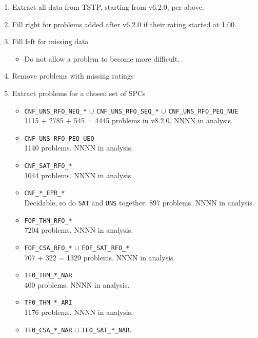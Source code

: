 \documentclass[runningheads]{llncs}
\begin{document}
\begin{enumerate}
\item Extract all data from TSTP, starting from v6.2.0, per above.
\item Fill right for problems added after v6.2.0 if their rating started at 1.00. 
\item Fill left for missing data
      \begin{itemize}
      \item Do not allow a problem to become more difficult.
      \end{itemize}
\item Remove problems with missing ratings
\item Extract problems for a chosen set of SPCs 
      \begin{itemize}
      \item {\tt CNF\_UNS\_RFO\_NEQ\_*} $\cup$ {\tt CNF\_UNS\_RFO\_SEQ\_*} $\cup$ 
            {\tt CNF\_UNS\_RFO\_PEQ\_NUE} \\
            1115 + 2785 + 545 = 4445 problems in v8.2.0. NNNN in analysis.
      \item {\tt CNF\_UNS\_RFO\_PEQ\_UEQ} \\
            1140 problems. NNNN in analysis.
      \item {\tt CNF\_SAT\_RFO\_*} \\
            1044 problems. NNNN in analysis.
      \item {\tt CNF\_*\_EPR\_*} \\ 
            Decidable, so do {\tt SAT} and {\tt UNS} together.
            897 problems. NNNN in analysis.
      \item {\tt FOF\_THM\_RFO\_*} \\
            7204 problems. NNNN in analysis.
      \item {\tt FOF\_CSA\_RFO\_*} $\cup$ {\tt FOF\_SAT\_RFO\_*} \\
            707 + 322 = 1329 problems. NNNN in analysis.
      \item {\tt TF0\_THM\_*\_NAR} \\
            400 problems. NNNN in analysis.
      \item {\tt TF0\_THM\_*\_ARI} \\
            1176 problems. NNNN in analysis.
      \item {\tt TF0\_CSA\_*\_NAR} $\cup$ {\tt TF0\_SAT\_*\_NAR}. 

\end{itemize}
\end{enumerate}
\end{document}
